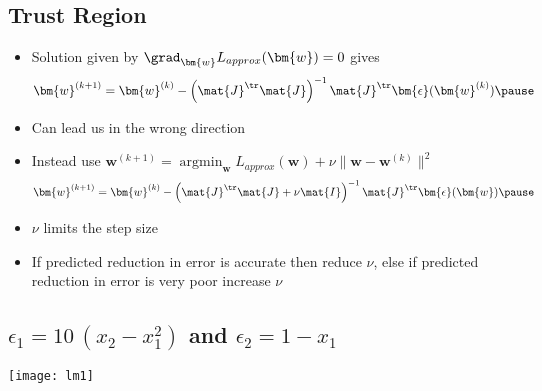\begin{slide}
\section[-1]{Trust Region}

\begin{PauseHighLight}
  \begin{itemize}
  \item Solution given by $\grad_{\bm{w}} L_{approx}(\bm{w}) = 0$ gives
    \begin{align*}
      \bm{w}^{(k+1)} = \bm{w}^{(k)} -
      \left(\mat{J}^\tr\mat{J}\right)^{-1} \mat{J}^\tr
      \bm{\epsilon}(\bm{w}^{(k)})\pause
    \end{align*}
  \item Can lead us in the wrong direction\pause
  \item Instead use $\bm{w}^{(k+1)}= \mathop{\mathrm{argmin}}_{\bm{w}} L_{approx}(\bm{w}) + \nu
    \|\bm{w}-\bm{w}^{(k)}\|^2$
    \begin{align*}
      \bm{w}^{(k+1)} = \bm{w}^{(k)} -
      \left(\mat{J}^\tr\mat{J} + \nu \mat{I}\right)^{-1} \mat{J}^\tr
      \bm{\epsilon}(\bm{w})\pause
    \end{align*}
  \item $\nu$ limits the step size\pause
  \item If predicted reduction in error is accurate then reduce $\nu$,
    else if predicted reduction in error is very poor increase
    $\nu$\pause
  \end{itemize}
\end{PauseHighLight}

\end{slide}


\begin{slide}
\section[-2]{$\epsilon_1 = 10\,(x_2-x_1^2)$ and $\epsilon_2=1-x_1$}
\pb\pause
\begin{center}
  \texttt{[image: lm1]}
\end{center}

\end{slide}


